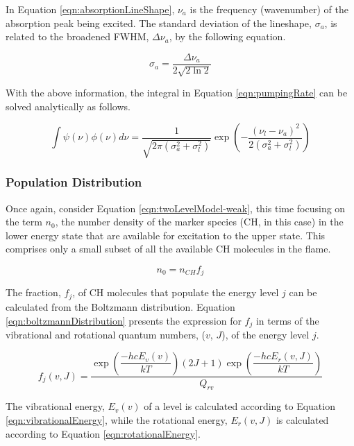 In Equation \ref{eqn:absorptionLineShape}, \(\nu_a\) is the frequency (wavenumber) of the absorption peak being excited.
The standard deviation of the lineshape, \(\sigma_a\), is related to the broadened FWHM, \(\Delta\nu_a\), by the following equation.

\begin{equation}
  \sigma_a = \frac{\Delta\nu_a}{2 \sqrt{ 2 \ln{2} } }
\end{equation}

With the above information, the integral in Equation \ref{eqn:pumpingRate} can be solved analytically as follows.

\begin{equation}
  \int \psi(\nu) \phi(\nu) d\nu = \frac{1}{\sqrt{2\pi ( \sigma_a^2 + \sigma_l^2 )}} \exp{\left(-\frac{ (\nu_l - \nu_a )^2 }{2 ( \sigma_a^2 + \sigma_l^2 )}\right)}
  \label{eqn:absorptionIntegral}
\end{equation}

\subsubsection{Population Distribution}
\label{subsubsec:basic-model-population-distribution}

Once again, consider Equation \ref{eqn:twoLevelModel-weak}, this time focusing on the term \(n_0\), the number density of the marker species (CH, in this case) in the lower energy state that are available for excitation to the upper state.
This comprises only a small subset of all the available CH molecules in the flame.

\begin{equation}
  n_0 = n_{CH}f_j
  \label{eqn:boltzmannFraction}
\end{equation}

The fraction, \(f_j\), of CH molecules that populate the energy level \(j\) can be calculated from the Boltzmann distribution.
Equation \ref{eqn:boltzmannDistribution} presents the expression for \(f_j\) in terms of the vibrational and rotational quantum numbers, (\(v\), \(J\)), of the energy level \(j\).

\begin{equation}
  f_j(v,J) = \frac{ \exp{\left(\dfrac{-hcE_v(v)}{kT}\right)} (2J + 1)\exp{\left(\dfrac{-hcE_r(v, J)}{kT}\right)} }{ Q_{rv} }
  \label{eqn:boltzmannDistribution}
\end{equation}

The vibrational energy, \(E_v(v)\) of a level is calculated according to Equation \ref{eqn:vibrationalEnergy}, while the rotational energy, \(E_r(v,J)\) is calculated according to Equation \ref{eqn:rotationalEnergy}.

